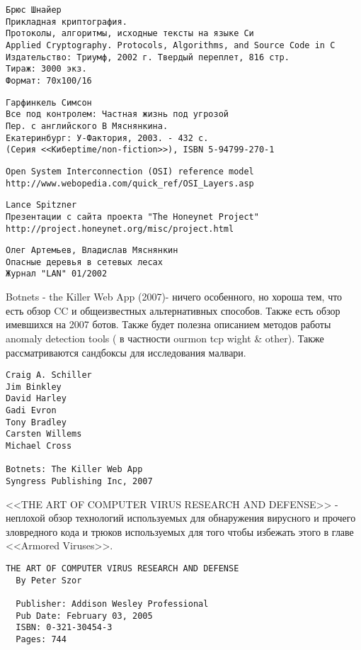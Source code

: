 \begin{thebibliography}{99}
\begin{verbatim}
Брюс Шнайер
Прикладная криптография.
Протоколы, алгоритмы, исходные тексты на языке Си
Applied Cryptography. Protocols, Algorithms, and Source Code in C
Издательство: Триумф, 2002 г. Твердый переплет, 816 стр.
Тираж: 3000 экз.
Формат: 70x100/16
\end{verbatim}

\begin{verbatim}
Гарфинкель Симсон
Все под контролем: Частная жизнь под угрозой
Пер. с английского В Мяснянкина.
Екатеринбург: У-Фактория, 2003. - 432 с.
(Серия <<Киберtime/non-fiction>>), ISBN 5-94799-270-1
\end{verbatim}

\begin{verbatim}
Open System Interconnection (OSI) reference model
http://www.webopedia.com/quick_ref/OSI_Layers.asp
\end{verbatim}

\begin{verbatim}
Lance Spitzner
Презентации с сайта проекта "The Honeynet Project"
http://project.honeynet.org/misc/project.html
\end{verbatim}

\begin{verbatim}
Олег Артемьев, Владислав Мяснянкин
Опасные деревья в сетевых лесах
Журнал "LAN" 01/2002
\end{verbatim}

Botnets - the Killer Web App (2007)- ничего особенного, но хороша тем, что есть обзор CC и общеизвестных альтернативных способов. Также есть обзор имевшихся на 2007 ботов. Также будет полезна описанием методов работы anomaly detection tools ( в частности ourmon tcp wight \& other). Также рассматриваются сандбоксы для исследования малвари.
\begin{verbatim}
Craig A. Schiller
Jim Binkley
David Harley
Gadi Evron
Tony Bradley
Carsten Willems
Michael Cross

Botnets: The Killer Web App
Syngress Publishing Inc, 2007
\end{verbatim}

<<THE ART OF COMPUTER VIRUS RESEARCH AND DEFENSE>> - неплохой обзор технологий используемых для
обнаружения вирусного и прочего зловредного кода и трюков используемых для того чтобы избежать этого в главе <<Armored Viruses>>.
\begin{verbatim}
THE ART OF COMPUTER VIRUS RESEARCH AND DEFENSE
  By Peter Szor

  Publisher: Addison Wesley Professional
  Pub Date: February 03, 2005
  ISBN: 0-321-30454-3
  Pages: 744
\end{verbatim}

\end{thebibliography}
